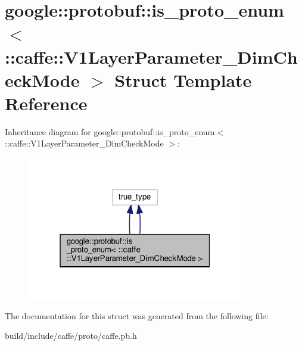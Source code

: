 \hypertarget{structgoogle_1_1protobuf_1_1is__proto__enum_3_01_1_1caffe_1_1_v1_layer_parameter___dim_check_mode_01_4}{}\section{google\+:\+:protobuf\+:\+:is\+\_\+proto\+\_\+enum$<$ \+:\+:caffe\+:\+:V1\+Layer\+Parameter\+\_\+\+Dim\+Check\+Mode $>$ Struct Template Reference}
\label{structgoogle_1_1protobuf_1_1is__proto__enum_3_01_1_1caffe_1_1_v1_layer_parameter___dim_check_mode_01_4}


Inheritance diagram for google\+:\+:protobuf\+:\+:is\+\_\+proto\+\_\+enum$<$ \+:\+:caffe\+:\+:V1\+Layer\+Parameter\+\_\+\+Dim\+Check\+Mode $>$\+:
\nopagebreak
\begin{figure}[H]
\begin{center}
\leavevmode
\includegraphics[width=268pt]{structgoogle_1_1protobuf_1_1is__proto__enum_3_01_1_1caffe_1_1_v1_layer_parameter___dim_check_mode_01_4__inherit__graph}
\end{center}
\end{figure}


The documentation for this struct was generated from the following file\+:\begin{DoxyCompactItemize}
\item 
build/include/caffe/proto/caffe.\+pb.\+h\end{DoxyCompactItemize}
